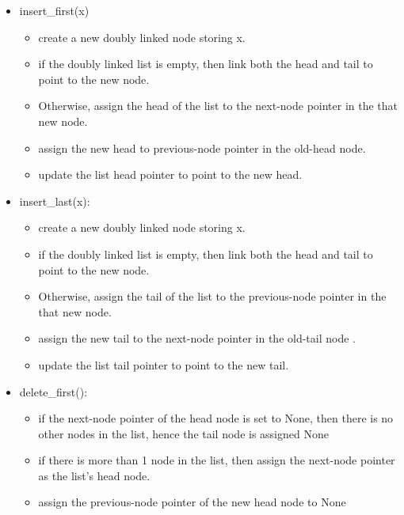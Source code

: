 \begin{problems}
\newpage

\problem  %

\begin{problemparts}
\problempart %

\begin{itemize}

    \item insert\_first(x)
        \begin{itemize}

            \item create a new doubly linked node storing x.
            \item if the doubly linked list is empty, then link both the head and tail to point to the new node.
			\item Otherwise, assign the head of the list to the next-node pointer in the that new node.
			\item assign the new head to previous-node pointer in the old-head node.
			\item update the list head pointer to point to the new head.

        \end{itemize}

    \item insert\_last(x):
    		\begin{itemize}

			\item create a new doubly linked node storing x.
			\item if the doubly linked list is empty, then link both the head and tail to point to the new node.
			\item Otherwise, assign the tail of the list to the previous-node pointer in the that new node.
			\item assign the new tail to the next-node pointer in the old-tail node .
			\item update the list tail pointer to point to the new tail.

          \end{itemize}
          
     \item delete\_first():
        \begin{itemize}
			\item if the next-node pointer of the head node is set to None, then there is no other nodes in the list, hence the tail node is assigned None
			\item if there is more than 1 node in the list, then assign the next-node pointer as the list's head node.
			\item assign the previous-node pointer of the new head node to None
        \end{itemize}


\end{itemize}
\end{problemparts}
\end{problems}
